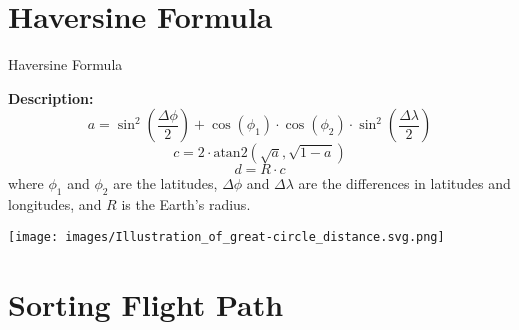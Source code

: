 \documentclass[aspectratio=169,xcolor=dvipsnames]{beamer}
\begin{document}
\section{Haversine Formula}

\begin{frame}{Haversine Formula}
    \begin{minipage}[t]{0.5\textwidth}
        \vspace{-3cm} 
        \textbf{Description:} \\
        \vspace{0.1cm} %
        \[
        a = \sin^2\left(\frac{\Delta \phi}{2}\right) + \cos(\phi_1) \cdot \cos(\phi_2) \cdot \sin^2\left(\frac{\Delta \lambda}{2}\right)
        \]
        \[
        c = 2 \cdot \text{atan2}\left(\sqrt{a}, \sqrt{1-a}\right)
        \]
        \[
        d = R \cdot c
        \]
        where \( \phi_1 \) and \( \phi_2 \) are the latitudes, \( \Delta \phi \) and \( \Delta \lambda \) are the differences in latitudes and longitudes, and \( R \) is the Earth's radius.
    \end{minipage}
    \hfill
    \begin{minipage}{0.45\textwidth}
        \centering
        \texttt{[image: images/Illustration\_of\_great-circle\_distance.svg.png]} 
    \end{minipage}
\end{frame}

\section{Sorting Flight Path}
\end{document}
